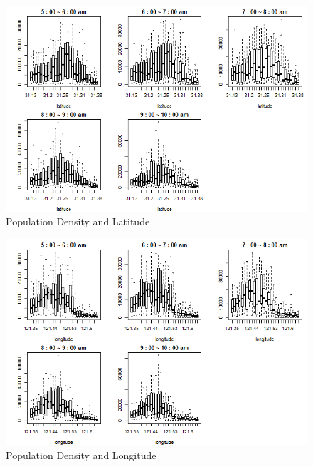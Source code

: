 \documentclass[hidelinks,12pt]{article}
\begin{document}
	\begin{figure}[!ht]
		\includegraphics[width=\textwidth]{lat.png}
		\caption{Population Density and Latitude\label{fig:lat}}
	\end{figure}
	\FloatBarrier
	
	\begin{figure}[!ht]
		\includegraphics[width=\textwidth]{long.png}
		\caption{Population Density and Longitude\label{fig:long}}
	\end{figure}
	\FloatBarrier
	
\end{document}
